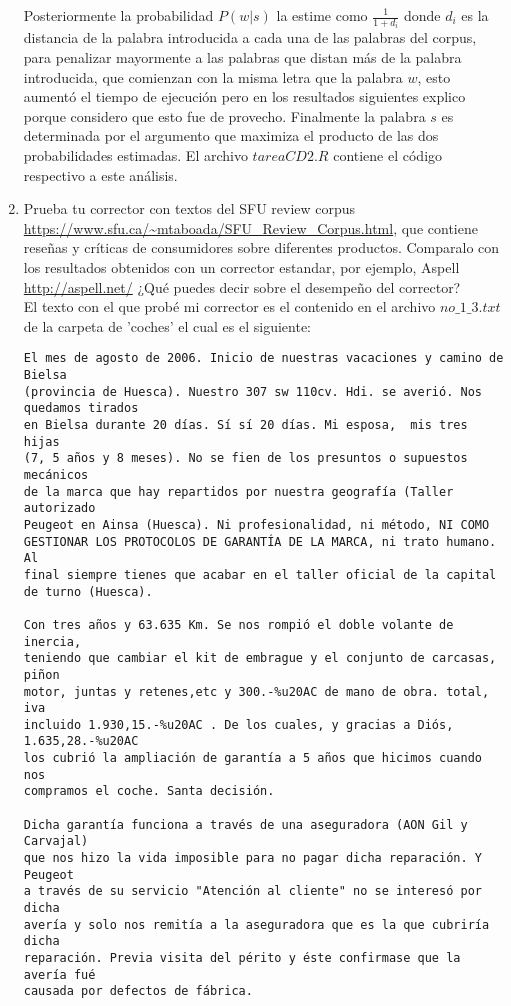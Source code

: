 \documentclass[paper=letter, fontsize=11pt]{scrartcl}
\numberwithin{equation}{section} %
\numberwithin{figure}{section} %
\numberwithin{table}{section} %
\begin{document}
\begin{enumerate}
Posteriormente la probabilidad $P(w|s)$ la estime como $\frac{1}{1+d_i}$ donde $d_i$ es la distancia de la palabra introducida a cada una de las palabras del corpus, para penalizar mayormente a las palabras que distan más de la palabra introducida, que comienzan con la misma letra que la palabra $w$, esto aumentó el tiempo de ejecución pero en los resultados siguientes explico porque considero que esto fue de provecho.
Finalmente la palabra $s$ es determinada por el argumento que maximiza el producto de las dos probabilidades estimadas. 
El archivo $tareaCD2.R$ contiene el código respectivo a este análisis.


\item Prueba tu corrector con textos del SFU review corpus \url{https://www.sfu.ca/~mtaboada/SFU_Review_Corpus.html}, que contiene reseñas y críticas de consumidores sobre diferentes productos. Comparalo con los resultados obtenidos con un corrector estandar, por ejemplo, Aspell \url{http://aspell.net/} ¿Qué puedes decir sobre
el desempeño del corrector?\\

El texto con el que probé mi corrector es el contenido en el archivo $no\_1\_3.txt$ de la carpeta de 'coches' el cual es el siguiente:\\

\begin{verbatim}
El mes de agosto de 2006. Inicio de nuestras vacaciones y camino de Bielsa
(provincia de Huesca). Nuestro 307 sw 110cv. Hdi. se averió. Nos quedamos tirados
en Bielsa durante 20 días. Sí sí 20 días. Mi esposa,  mis tres hijas
(7, 5 años y 8 meses). No se fien de los presuntos o supuestos mecánicos
de la marca que hay repartidos por nuestra geografía (Taller autorizado
Peugeot en Ainsa (Huesca). Ni profesionalidad, ni método, NI COMO
GESTIONAR LOS PROTOCOLOS DE GARANTÍA DE LA MARCA, ni trato humano. Al
final siempre tienes que acabar en el taller oficial de la capital de turno (Huesca).

Con tres años y 63.635 Km. Se nos rompió el doble volante de inercia,
teniendo que cambiar el kit de embrague y el conjunto de carcasas, piñon
motor, juntas y retenes,etc y 300.-%u20AC de mano de obra. total, iva
incluido 1.930,15.-%u20AC . De los cuales, y gracias a Diós, 1.635,28.-%u20AC
los cubrió la ampliación de garantía a 5 años que hicimos cuando nos
compramos el coche. Santa decisión.

Dicha garantía funciona a través de una aseguradora (AON Gil y Carvajal)
que nos hizo la vida imposible para no pagar dicha reparación. Y Peugeot 
a través de su servicio "Atención al cliente" no se interesó por dicha
avería y solo nos remitía a la aseguradora que es la que cubriría dicha
reparación. Previa visita del périto y éste confirmase que la avería fué
causada por defectos de fábrica.


\end{verbatim}
\end{enumerate}
\end{document}
